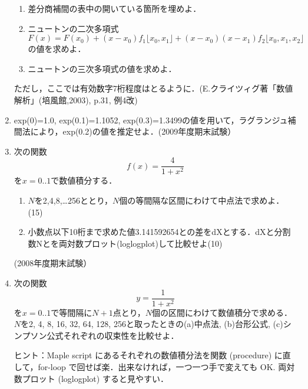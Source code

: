 \begin{enumerate}
\begin{enumerate}
\item 差分商補間の表中の開いている箇所を埋めよ．
\item ニュートンの二次多項式
\begin{equation*}
F (x )=F (x _{0})+(x -x _{0})f _{1}\lfloor x_0,x_1\rfloor+(x -x _{0})(x -x _{1})
f _{2}\lfloor x_0,x_1,x_2\rfloor
\end{equation*}
の値を求めよ．
\item ニュートンの三次多項式の値を求めよ．
\end{enumerate}
ただし，ここでは有効数字7桁程度はとるように．(E.クライツィグ著「数値解析」(培風館,2003), p.31, 例4改)

\item exp(0)=1.0, exp(0.1)=1.1052, exp(0.3)=1.3499の値を用いて，ラグランジュ補間法により，exp(0.2)の値を推定せよ．(2009年度期末試験）
\item 次の関数
\begin{equation*}
f(x) = \frac{4}{1+x^2}
\end{equation*}
を$x = 0..1$で数値積分する．
\begin{enumerate}
\item $N$を2,4,8,…256ととり，$N$個の等間隔な区間にわけて中点法で求めよ．(15)
\item 小数点以下10桁まで求めた値3.141592654との差をdXとする．dXと分割数Nとを両対数プロット(loglogplot)して比較せよ(10)
\end{enumerate}
(2008年度期末試験）
\item 次の関数
\begin{equation*}
y = \frac{1}{1+x^2}
\end{equation*}
を$x = 0..1$で等間隔に$N+1$点とり，$N$個の区間にわけて数値積分で求める．$N$を2, 4, 8, 16, 32, 64, 128, 256と取ったときの(a)中点法, (b)台形公式, (c)シンプソン公式それぞれの収束性を比較せよ．

ヒント：Maple script にあるそれぞれの数値積分法を関数 (procedure) に直して，for-loop
で回せば楽．出来なければ，一つ一つ手で変えても OK. 両対数プロット (loglogplot) すると見やすい．
\end{enumerate}